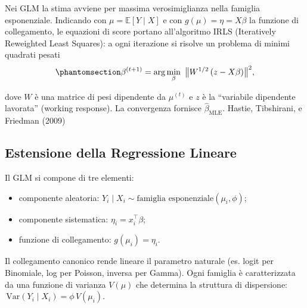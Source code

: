 \documentclass[
  italian,
  a4paper,
  a4paper,
  twoside,
  open=right,
  12pt]{scrbook}
\theoremstyle{definition}
\theoremstyle{remark}
\begin{document}
\begin{tcolorbox}[enhanced jigsaw, breakable, colframe=quarto-callout-tip-color-frame, toprule=.15mm, title=\textcolor{quarto-callout-tip-color}{\faLightbulb}\hspace{0.5em}{Curiosità}, arc=.35mm, colback=white, bottomrule=.15mm, bottomtitle=1mm, colbacktitle=quarto-callout-tip-color!10!white, toptitle=1mm, titlerule=0mm, opacityback=0, rightrule=.15mm, opacitybacktitle=0.6, leftrule=.75mm, left=2mm, coltitle=black]

Nei GLM la stima avviene per massima verosimiglianza nella famiglia
esponenziale. Indicando con \(\mu=\mathbb{E}[Y\mid X]\) e con
\(g(\mu)=\eta=X\beta\) la funzione di collegamento, le equazioni di
score portano all'algoritmo IRLS (Iteratively Reweighted Least Squares):
a ogni iterazione si risolve un problema di minimi quadrati pesati
\begin{equation}\phantomsection\label{eq-irls}{
\beta^{(t+1)}  =  \arg\min_{\beta}\ \big\|W^{1/2}\,(z - X\beta)\big\|^2,
}\end{equation}

dove \(W\) è una matrice di pesi dipendente da \(\mu^{(t)}\) e \(z\) è
la ``variabile dipendente lavorata'' (working response). La convergenza
fornisce \(\hat\beta_{\mathrm{MLE}}\). Hastie, Tibshirani, e Friedman
(2009)

\end{tcolorbox}

\subsection{Estensione della Regressione
Lineare}\label{estensione-della-regressione-lineare}

Il GLM si compone di tre elementi:

\begin{itemize}
\item
  componente aleatoria:
  \(Y_i \mid X_i \sim \text{famiglia esponenziale}(\mu_i,\phi)\);
\item
  componente sistematica: \(\eta_i = x_i^\top\beta\);
\item
  funzione di collegamento: \(g(\mu_i)=\eta_i\).
\end{itemize}

Il collegamento canonico rende lineare il parametro naturale (es. logit
per Binomiale, log per Poisson, inversa per Gamma). Ogni famiglia è
caratterizzata da una funzione di varianza \(V(\mu)\) che determina la
struttura di dispersione:
\(\,\mathrm{Var}(Y_i\mid X_i)=\phi\,V(\mu_i)\).
\end{document}
